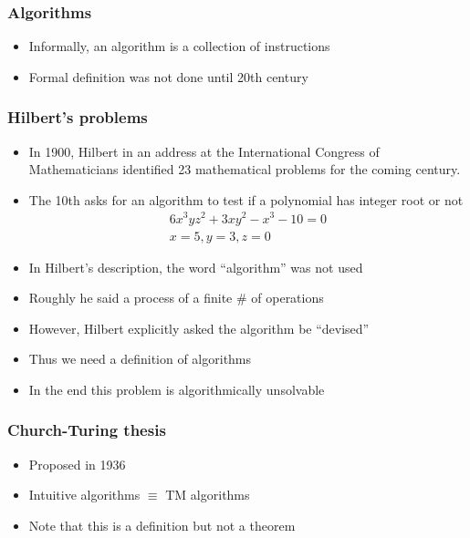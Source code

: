 




\begin{frame}[allowframebreaks] \frametitle{Algorithms}
  \begin{itemize}
    
\item Informally, an algorithm is a
collection of instructions
\item Formal definition was
not done until 20th century

\end{itemize}\end{frame} \begin{frame}[allowframebreaks] \frametitle{Hilbert's problems}
  \begin{itemize}
  \item In 1900, Hilbert in an address at the
International Congress of Mathematicians  identified
23 mathematical problems for the coming century.

\item The 10th asks for an algorithm to
  test if a polynomial has integer root or not
  \begin{gather*}
    6x^3 y z^2 + 3 x y^2 - x^3 - 10 = 0\\
x = 5, y = 3, z = 0
  \end{gather*}
\item In Hilbert's description, the word ``algorithm'' was
  not used

\item
  Roughly he said a process of a finite \# of operations

\item
  However, Hilbert explicitly asked the algorithm be ``devised''

  
\item Thus we need a definition of algorithms

\item In the end this problem is algorithmically unsolvable

\end{itemize}\end{frame}

\begin{frame}[allowframebreaks] \frametitle{Church-Turing thesis}
  \begin{itemize}
\item Proposed in 1936
\item Intuitive algorithms $\equiv$ TM algorithms
\item Note that this is a \alert{definition} but not a theorem

\end{itemize}\end{frame}

